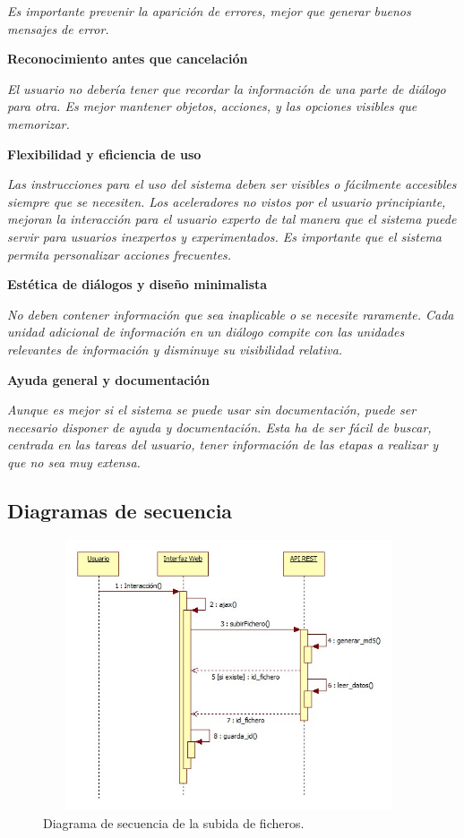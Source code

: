 \textit{Es importante prevenir la aparición de errores, mejor que generar buenos mensajes de error.}

\noindent
\textbf{Reconocimiento antes que cancelación}

\textit{El usuario no debería tener que recordar la información de una parte de diálogo para otra. Es mejor mantener objetos, acciones, y las opciones visibles que memorizar.}

\noindent
\textbf{Flexibilidad y eficiencia de uso}

\textit{Las instrucciones para el uso del sistema deben ser visibles o fácilmente accesibles siempre que se necesiten. Los aceleradores no vistos por el usuario principiante, mejoran la interacción para el usuario experto de tal manera que el sistema puede servir para usuarios inexpertos y experimentados. Es importante que el sistema permita personalizar acciones frecuentes.}

\noindent
\textbf{Estética de diálogos y diseño minimalista}

\textit{No deben contener información que sea inaplicable o se necesite raramente. Cada unidad adicional de información en un diálogo compite con las unidades relevantes de información y disminuye su visibilidad relativa.}

\noindent
\textbf{Ayuda general y documentación}

\textit{Aunque es mejor si el sistema se puede usar sin documentación, puede ser necesario disponer de ayuda y documentación. Esta ha de ser fácil de buscar, centrada en las tareas del usuario, tener información de las etapas a realizar y que no sea muy extensa.}

\subsection{Diagramas de secuencia}

\begin{figure}[H]
\centering
\includegraphics[width=11cm,height=8cm]{figuras/sec_subir_fichero.jpg}
\caption{Diagrama de secuencia de la subida de ficheros.}
\label{fig:sec_subir_fichero}
\end{figure}

